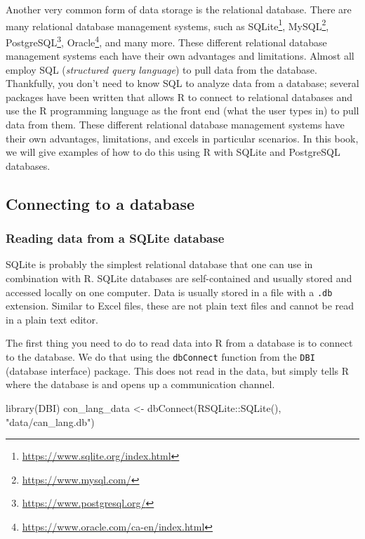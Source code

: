 \documentclass[
]{krantz}
\makeatletter
\newenvironment{Shaded}{\begin{snugshade}}{\end{snugshade}}
\newcommand{\FunctionTok}[1]{\textcolor[rgb]{0,0,0}{#1}}
\newcommand{\NormalTok}[1]{#1}
\newcommand{\OtherTok}[1]{\textcolor[rgb]{0.37,0.37,0.37}{#1}}
\newcommand{\SpecialCharTok}[1]{\textcolor[rgb]{0,0,0}{#1}}
\newcommand{\StringTok}[1]{\textcolor[rgb]{0.5,0.5,0.5}{#1}}
\renewcommand{\href}[2]{#2\footnote{\url{#1}}}
\newenvironment{kframe}{%
\medskip{}
\setlength{\fboxsep}{.8em}
 \def\at@end@of@kframe{}%
 \ifinner\ifhmode%
  \def\at@end@of@kframe{\end{minipage}}%
  \begin{minipage}{\columnwidth}%
 \fi\fi%
 \def\FrameCommand##1{\hskip\@totalleftmargin \hskip-\fboxsep
 \colorbox{shadecolor}{##1}\hskip-\fboxsep
     \hskip-\linewidth \hskip-\@totalleftmargin \hskip\columnwidth}%
 \MakeFramed {\advance\hsize-\width
   \@totalleftmargin\z@ \linewidth\hsize
   \@setminipage}}%
 {\par\unskip\endMakeFramed%
 \at@end@of@kframe}
\renewenvironment{Shaded}{\begin{kframe}}{\end{kframe}}
\makeatother
\begin{document}
Another very common form of data storage is the relational database. There are many relational database management systems, such as
\href{https://www.sqlite.org/index.html}{SQLite}, \href{https://www.mysql.com/}{MySQL}, \href{https://www.postgresql.org/}{PostgreSQL}, \href{https://www.oracle.com/ca-en/index.html}{Oracle}, and many more. These different relational database management systems each have their own advantages and limitations. Almost all employ SQL (\emph{structured query language}) to pull data from the database. Thankfully, you don't need to know SQL
to analyze data from a database;
several packages have been written
that allows R to connect to relational databases and use the R programming language as the front end (what the user types in) to pull data from them. These different relational database management systems have their own advantages, limitations, and excels in particular scenarios. In this book, we will
give examples of how to do this using R with SQLite and PostgreSQL databases.

\hypertarget{connecting-to-a-database}{%
\subsection{Connecting to a database}\label{connecting-to-a-database}}

\hypertarget{reading-data-from-a-sqlite-database}{%
\subsubsection{Reading data from a SQLite database}\label{reading-data-from-a-sqlite-database}}

SQLite is probably the simplest relational database that one can use in combination with R. SQLite databases are self-contained and usually stored and accessed locally on one computer. Data is usually stored in a file with a \texttt{.db} extension. Similar to Excel files, these are not plain text files and cannot be read in a plain text editor.

The first thing you need to do to read data into R from a database is to connect to the database. We do that using the \texttt{dbConnect} function from the \texttt{DBI} (database interface) package. This does not read in the data, but simply tells R where the database is and opens up a communication channel.

\begin{Shaded}
\begin{Highlighting}[]
\FunctionTok{library}\NormalTok{(DBI)}
\NormalTok{con\_lang\_data }\OtherTok{\textless{}{-}} \FunctionTok{dbConnect}\NormalTok{(RSQLite}\SpecialCharTok{::}\FunctionTok{SQLite}\NormalTok{(), }\StringTok{"data/can\_lang.db"}\NormalTok{)}
\end{Highlighting}
\end{Shaded}
\end{document}
